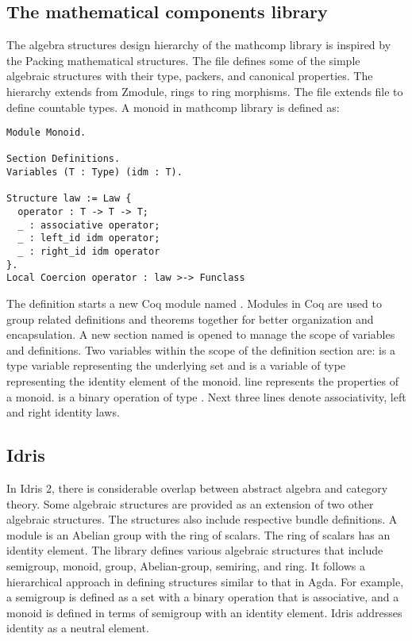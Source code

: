 \subsection{The mathematical components library}
The algebra structures design hierarchy of the mathcomp library is inspired by
the Packing mathematical structures. The  file defines
some of the simple algebraic structures with their type, packers, and canonical
properties. The hierarchy extends from Zmodule, rings to ring morphisms. The
 file extends  file to define
countable types. A monoid in mathcomp library is defined as:

\begin{verbatim}
Module Monoid.

Section Definitions.
Variables (T : Type) (idm : T).

Structure law := Law {
  operator : T -> T -> T;
  _ : associative operator;
  _ : left_id idm operator;
  _ : right_id idm operator
}.
Local Coercion operator : law >-> Funclass
\end{verbatim}

The definition starts a new Coq module named . Modules
in Coq are used to group related definitions and theorems together for better
organization and encapsulation. A new section named
 is opened to manage the scope of variables and
definitions. Two variables within the scope of the definition section are:
 is a type variable representing the underlying set and
 is a variable of type  representing the identity element
of the monoid.  line represents
the properties of a monoid.  is a binary operation of type
. Next three lines denote associativity, left and
right identity laws.

\subsection{Idris}

In Idris 2, there is considerable overlap between abstract algebra and category
theory. Some algebraic structures are provided as an extension of two other
algebraic structures. The structures also include respective bundle definitions.
A module is an Abelian group with the ring of scalars. The ring of scalars has
an identity element. The library defines various algebraic structures that
include semigroup, monoid, group, Abelian-group, semiring, and ring. It follows
a hierarchical approach in defining structures similar to that in Agda. For
example, a semigroup is defined as a set with a binary operation that is
associative, and a monoid is defined in terms of semigroup with an identity
element. Idris addresses identity as a neutral element.


